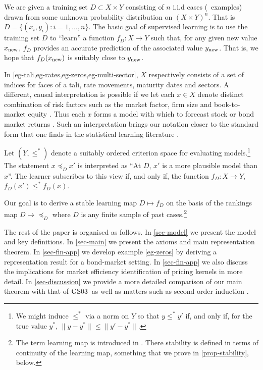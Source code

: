 \documentclass[12pt,a4paper,twoside]{article}
\newcommand{\gsii}{$\textup{GS03}$}
\newcommand{\preceqb}{\mathbin{\preceq}}
\begin{document}
\begin{example}\label{eg-supervised}
  We are given a training set $D \subset X\times Y$ consisting of $n$ i.i.d
  cases (\ie\ examples) drawn from some unknown probability distribution
  on $(X\times Y)^n$. That is $ D = \{(x_i, y_i): i = 1, \dots, n\}$. The basic
  goal of supervised learning is to use the training set $D$ to ``learn'' a
  function $f_D: X \rightarrow Y$ such that, for any given new value
  $x_{\textup{new}}$, $f_D$ provides an accurate prediction of the associated
  value $y_\textup{new}$. That is, we hope that $f_D(x_\textup{new})$ is
  suitably close to $y_\textup{new}$.
\end{example}

\begin{example}\label{eg-factors}
  In \cref{eg-tali,eg-rates,eg-zeros,eg-multi-sector}, $X$ respectively
  consists of a set of indices for faces of a tali, rate movements, maturity
  dates and sectors. A different, causal interpretation is possible if we let
  each $x \in X$ denote distinct combination of risk factors such as the market
  factor, firm size and book-to-market equity \citep{Fama-French}. Thus each
  $x$ forms a model with which to forecast stock or bond market returns
  \citep{Fama-French,Harvey-Liu,machine-learning}.  Such an interpretation
  brings our notation closer to the standard form that one finds in the
  statistical learning literature
  \citep{Cucker-Smale,Smale-Poggio,Mukherjee-Poggio}.


  Let $(Y, \leq^*)$ denote a suitably ordered criterion space for evaluating
  models.\footnote{We might induce $\leq^*$ via a norm on $Y$ so that $y \leq^*
  y'$ if, and only if, for the true value $y^*$, $\lVert y - y^*\rVert \leq
  \lVert y' - y^*\rVert$.}  The statement $x \preceq_D x'$ is interpreted as
  ``At $D$, $x'$ is a more plausible model than $x$''. The learner subscribes
  to this view if, and only if, the function $f_D: X \rightarrow Y$, $f_D(x')
  \leq^* f_D(x)$.

  Our goal is to derive a stable learning map $D \mapsto f_D$ on the basis of
  the rankings map $D \mapsto \preceqb_D$ where $D$ is any finite sample of past
  cases.\footnote{The term learning map is introduced in
  \citet{Mukherjee-Poggio}. There stability is defined in terms of continuity
  of the learning map, something that we prove in \cref{prop-stability},
  below.}
\end{example}
    The rest of the paper is organised as follows. In \cref{sec-model} we
    present the model and key definitions. In \cref{sec-main} we present the
    axioms and main representation theorem. In \cref{sec-fin-app} we develop
    example \cref{eg-zeros} by deriving a representation result for a
    bond-market setting. In \cref{sec-fin-app} we also discuss the implications
    for market efficiency identification of pricing kernels in more detail. In
    \cref{sec-discussion} we provide a more detailed comparison of our main
    theorem with that of \gsii\ as well as matters such as second-order
    induction \citep{AG-Second_order_induction}.
 
\end{document}
